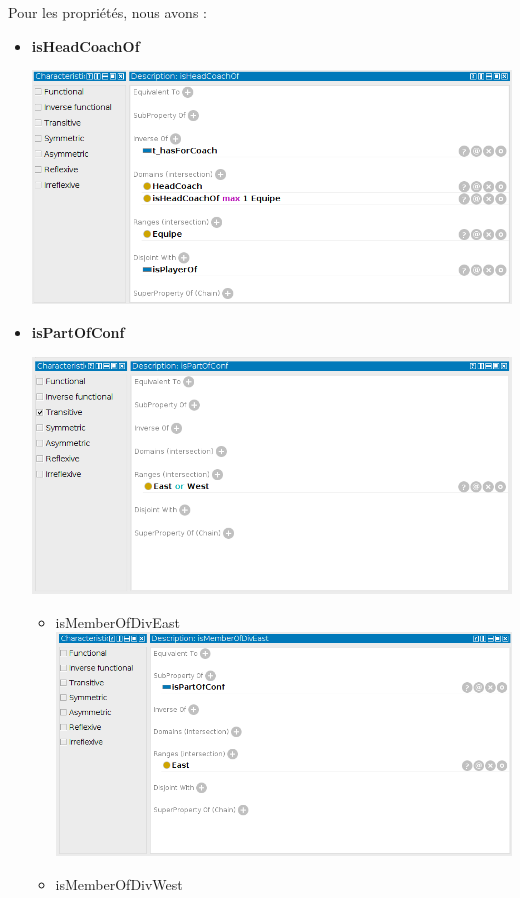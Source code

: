 \documentclass[a4paper,11pt]{article}
\begin{document}
Pour les propriétés, nous avons :
\begin{itemize}
    \item \textbf{isHeadCoachOf} 
    
    \includegraphics[width=.75\linewidth]{./img/1.png} \\
    
    \item \textbf{isPartOfConf}
    
    \includegraphics[width=.75\linewidth]{./img/2.png} \\
    
        \begin{itemize}
            \item isMemberOfDivEast \\
            
            \includegraphics[width=.75\linewidth]{./img/3.png} \\
            
            \item isMemberOfDivWest \\
            

\end{itemize}
\end{itemize}
\end{document}
